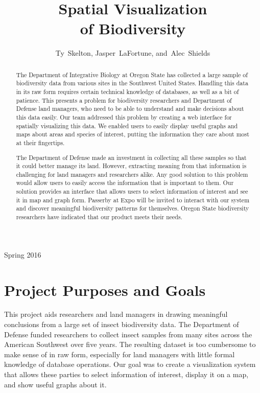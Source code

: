 \documentclass[10pt,draftclsnofoot,onecolumn]{IEEEtran}
\begin{document}
\singlespacing
\title{Spatial Visualization\\ of Biodiversity}

\author{Ty~Skelton,
        Jasper~LaFortune,
        and~Alec~Shields}%

%
{Spring 2016}

\maketitle

\begin{abstract} %
The Department of Integrative Biology at Oregon State has collected a large sample of biodiversity data from various sites in the Southwest United States.
Handling this data in its raw form requires certain technical knowledge of databases, as well as a bit of patience.
This presents a problem for biodiversity researchers and Department of Defense land managers, who need to be able to understand and make decisions about this data easily.
Our team addressed this problem by creating a web interface for spatially visualizing this data.
We enabled users to easily display useful graphs and maps about areas and species of interest, putting the information they care about most at their fingertips.

The Department of Defense made an investment in collecting all these samples so that it could better manage its land.
However, extracting meaning from that information is challenging for land managers and researchers alike.
Any good solution to this problem would allow users to easily access the information that is important to them.
Our solution provides an interface that allows users to select information of interest and see it in map and graph form.
Passerby at Expo will be invited to interact with our system and discover meaningful biodiversity patterns for themselves.
Oregon State biodiversity researchers have indicated that our product meets their needs.

\end{abstract}
\IEEEpeerreviewmaketitle

\newpage
{}

\section{Project Purposes and Goals} %
This project aids researchers and land managers in drawing meaningful conclusions from a large set of insect biodiversity data.
The Department of Defense funded researchers to collect insect samples from many sites across the American Southwest over five years.
The resulting dataset is too cumbersome to make sense of in raw form, especially for land managers with little formal knowledge of database operations.
Our goal was to create a visualization system that allows these parties to select information of interest, display it on a map, and show useful graphs about it.
\end{document}
